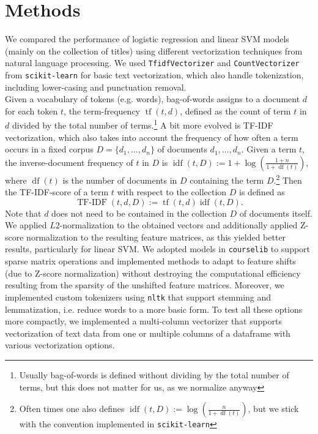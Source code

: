 \documentclass[10pt]{article}
\begin{document}
	\section{Methods}
	We compared the performance of logistic regression and linear SVM models (mainly on the collection of titles) using different vectorization techniques from natural language processing. 
	We used \texttt{TfidfVectorizer} and \texttt{CountVectorizer} from \texttt{scikit-learn} for basic text vectorization, which also handle tokenization, including lower-casing and punctuation removal.\\
	Given a vocabulary of tokens (e.g. words), bag-of-words assigns to a document $d$ for each token $t$, the term-frequency $\operatorname{tf}(t,d)$, defined as the count of term $t$ in $d$ divided by the total number of terms.\footnote{Usually bag-of-words is defined without dividing by the total number of terms, but this does not matter for us, as we normalize anyway}
	 A bit more evolved is TF-IDF vectorization, which also takes into account the frequency of how often a term occurs in a fixed corpus $D=\{d_1, \dots, d_n\}$ of documents $d_1, \dots, d_n$. Given a term $t$, the inverse-document frequency of $t$ in $D$ is $\operatorname{idf}(t,D):=1+\log\left(\frac{1+n}{1+\operatorname{df}(t)}\right)$, where $\operatorname{df}(t)$ is the number of documents in $D$ containing the term $D$.\footnote{Often times one also defines  $\operatorname{idf}(t,D):=\log\left(\frac{n}{1+\operatorname{df}(t)}\right)$, but we stick with the convention implemented in \texttt{scikit-learn}} Then the TF-IDF-score of a term $t$ with respect to the collection $D$ is defined as \[\operatorname{TF-IDF}(t,d,D):=\operatorname{tf}(t,d)\operatorname{idf}(t,D).\]
	Note that $d$ does not need to be contained in the collection $D$ of documents itself. We applied $L2$-normalization to the obtained vectors and additionally applied Z-score normalization to the resulting feature matrices, as this yielded better results, particularly for linear SVM. 
	We adopted models in \texttt{courselib} to support sparse matrix operations and implemented methods to adapt to feature shifts (due to Z-score normalization) without destroying the computational efficiency resulting from the sparsity of the unshifted feature matrices. Moreover, we implemented custom tokenizers using \texttt{nltk} that support stemming and lemmatization, i.e. reduce words to a more basic form. To test all these options more compactly, we implemented a multi-column vectorizer that supports vectorization of text data from one or multiple columns of a dataframe with various vectorization options.
\end{document}
